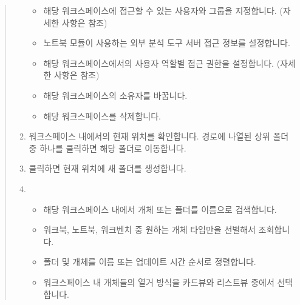 \documentclass[letterpaper,10pt,english]{sphinxmanual}
\begin{document}
\begin{quote}
\begin{enumerate}
\begin{itemize}
\item {} 
 해당 워크스페이스에 접근할 수 있는 사용자와 그룹을 지정합니다. (자세한 사항은 {\hyperref[\detokenize{discovery/part03/shared_workspace:shared-workspace-permission}]{}} 참조)

\item {} 
 노트북 모듈이 사용하는 외부 분석 도구 서버 접근 정보를 설정합니다.

\item {} 
 해당 워크스페이스에서의 사용자 역할별 접근 권한을 설정합니다. (자세한 사항은 {\hyperref[\detokenize{discovery/part03/shared_workspace:shared-workspace-permission}]{}} 참조)

\item {} 
 해당 워크스페이스의 소유자를 바꿉니다.

\item {} 
 해당 워크스페이스를 삭제합니다.

\end{itemize}

\item {} 
 워크스페이스 내에서의 현재 위치를 확인합니다. 경로에 나열된 상위 폴더 중 하나를 클릭하면 해당 폴더로 이동합니다.

\item {} 
 클릭하면 현재 위치에 새 폴더를 생성합니다.

\item {} 
\begin{itemize}
\item {} 
 해당 워크스페이스 내에서 개체 또는 폴더를 이름으로 검색합니다.

\item {} 
 워크북, 노트북, 워크벤치 중 원하는 개체 타입만을 선별해서 조회합니다.

\item {} 
 폴더 및 개체를 이름 또는 업데이트 시간 순서로 정렬합니다.

\item {} 
 워크스페이스 내 개체들의 열거 방식을 카드뷰와 리스트뷰 중에서 선택합니다.


\end{itemize}
\end{enumerate}
\end{quote}
\end{document}
